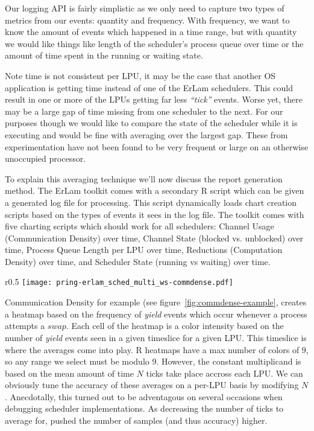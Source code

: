 Our logging API is fairly simplistic as we only need to capture two types of metrics
from our events: quantity and frequency. With frequency, we want to know the
amount of events which happened in a time range, but with quantity we would like 
things like length of the scheduler's process queue over time or the amount of
time spent in the running or waiting state.

Note time is not consistent per LPU, it may be the case that another OS 
application is getting time instead of one of the ErLam schedulers. This could
result in one or more of the LPUs getting far less \emph{``tick''} events. Worse
yet, there may be a large gap of time missing from one scheduler to the next.
For our purposes though we would like to compare the state of the scheduler
while it is executing and would be fine with averaging over the largest gap. These
from experimentation have not been found to be very frequent or large on an
otherwise unoccupied processor.

To explain this averaging technique we'll now discuss the report generation 
method. The ErLam toolkit comes with a secondary R script which can be given a 
generated log file for processing. This script dynamically loads chart 
creation scripts based on the types of events it sees in the log file. The
toolkit comes with five charting scripts which should work for all schedulers: 
Channel Usage (Communication Density) over time,
Channel State (blocked vs. unblocked) over time,
Process Queue Length per LPU over time,
Reductions (Computation Density) over time, and
Scheduler State (running vs waiting) over time.

\begin{wrapfigure}{r}{0.5\textwidth}
\centering
\texttt{[image: pring-erlam\_sched\_multi\_ws-commdense.pdf]}
\caption{\footnotesize Example of Communication Density graph for the Work-Stealing scheduler 
on a Core i7 running the $PRing$ application.}
\label{fig:commdense-example}
\end{wrapfigure}

Communication Density for example (see figure~\ref{fig:commdense-example}, 
creates a heatmap based on the frequency of
\emph{yield} events which occur whenever a process attempts a $swap$. Each cell
of the heatmap is a color intensity based on the number of \emph{yield} events 
seen in a given timeslice for a given LPU. This timeslice is where the averages
come into play. R heatmaps have a max number of colors of $9$, so any range we 
select must be modulo $9$. However, the constant multiplicand is based on the
mean amount of time $N$ ticks take place accross each LPU.
We can obviously tune the accuracy of these averages on a per-LPU basis by
modifying $N$. Anecdotally, this turned out to be adventagous on several 
occasions when debugging scheduler implementations. As decreasing the number of
ticks to average for, pushed the number of samples (and thus accuracy) higher.

